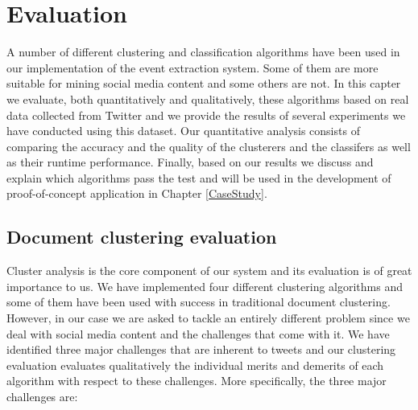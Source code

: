 \chapter{Evaluation}\label{Evaluation}
\ifpdf
    \graphicspath{{Chapter4/Chapter4Figs/PNG/}{Chapter4/Chapter4Figs/PDF/}{Chapter4/Chapter4Figs/}}
\else
    \graphicspath{{Chapter4/Chapter4Figs/EPS/}{Chapter4/Chapter4Figs/}}
\fi
A number of different clustering and classification algorithms have been used in our implementation of the event extraction system. 
Some of them are more suitable for mining social media content and some others are not. In this capter we evaluate, both quantitatively and qualitatively, 
these algorithms based on real data collected from Twitter and we provide the results of several experiments we have conducted using this dataset. 
Our quantitative analysis consists of comparing the accuracy and the quality of the clusterers and the classifers as well as their runtime performance. 
Finally, based on our results we discuss and explain which algorithms pass the test and will be used in the development of 
proof-of-concept application in Chapter \ref{CaseStudy}.

\section{Document clustering evaluation}
Cluster analysis is the core component of our system and its evaluation is of great importance to us. We have implemented 
four different clustering algorithms and some of them have been used with success in traditional document clustering. However,
in our case we are asked to tackle an entirely different problem since we deal with social media content and the challenges that come with it. 
We have identified three major challenges that are inherent to tweets and our clustering evaluation evaluates qualitatively the individual merits and demerits 
of each algorithm with respect to these challenges. More specifically, the three major challenges are:

